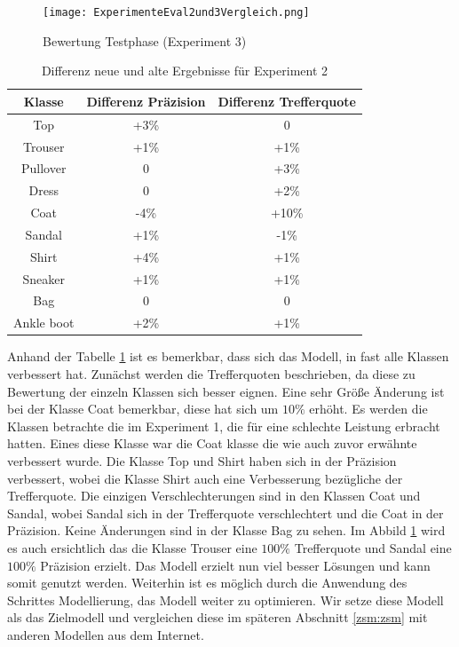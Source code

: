 \documentclass[12pt]{scrreprt}
\begin{document}
\begin{figure}[h!]
	\centering
	\texttt{[image: ExperimenteEval2und3Vergleich.png]}
	\caption{ Bewertung Testphase \cite{HK22}(Experiment 3)}
	\label{fig:fig20}
\end{figure}

\newpage
\begin{table}[h!]
	\begin{center}
		\begin{tabular}{|c|c|c|}
			\hline
			Klasse & Differenz Präzision & Differenz Trefferquote \\
			\hline
			Top  & +3\% & 0\\
			\hline
			Trouser  & +1\% & +1\%  \\
			\hline
			Pullover   & 0 & +3\% \\
			\hline
			Dress   & 0 & +2\% \\
			\hline
			Coat   & -4\% & +10\% \\
			\hline
			Sandal & +1\% & -1\% \\
			\hline
			Shirt & +4\% & +1\% \\
			\hline
			Sneaker & +1\% & +1\% \\
			\hline
			Bag & 0 & 0 \\
			\hline
			Ankle boot & +2\% & +1\% \\
			\hline
		\end{tabular}
		\caption{Differenz neue und alte Ergebnisse für Experiment 2}
		\label{tab:differenz2}
	\end{center}
\end{table}

Anhand der Tabelle \ref{tab:differenz2} ist es bemerkbar, dass sich das Modell, in fast alle Klassen verbessert hat. Zunächst werden die Trefferquoten beschrieben, da diese zu Bewertung der einzeln Klassen sich besser eignen. Eine sehr Größe Änderung ist bei der Klasse Coat bemerkbar, diese hat sich um $10\%$ erhöht. Es werden die Klassen betrachte die im Experiment 1, die für eine schlechte Leistung erbracht hatten. Eines diese Klasse war die Coat klasse die wie auch zuvor erwähnte verbessert wurde. Die Klasse Top und Shirt haben sich in der Präzision verbessert, wobei die Klasse Shirt auch eine Verbesserung bezügliche der Trefferquote. Die einzigen Verschlechterungen sind in den Klassen Coat und Sandal, wobei Sandal sich in der Trefferquote verschlechtert und die Coat in der Präzision. Keine Änderungen sind in der Klasse Bag zu sehen. Im Abbild \ref{fig:fig20} wird es auch ersichtlich das die Klasse Trouser eine $100\%$ Trefferquote und Sandal eine $100\%$ Präzision erzielt. Das Modell erzielt nun viel besser Lösungen und kann somit genutzt werden. Weiterhin ist es möglich durch die Anwendung des Schrittes Modellierung, das Modell weiter zu optimieren. Wir setze diese Modell als das Zielmodell und vergleichen diese im späteren Abschnitt \ref{zsm:zsm} mit anderen Modellen aus dem Internet.
\end{document}
